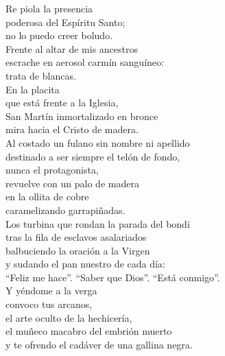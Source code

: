 

Re piola la presencia \\
poderosa del Espíritu Santo; \\
no lo puedo creer boludo. \\
Frente al altar de mis ancestros \\
escrache en aerosol carmín sanguíneo: \\
trata de blancas. \\
En la placita \\
que está frente a la Iglesia,\\
San Martín inmortalizado en bronce \\
mira hacia el Cristo de madera. \\
Al costado un fulano sin nombre ni apellido \\
destinado a ser siempre el telón de fondo, \\
nunca el protagonista, \\
revuelve con un palo de madera \\
en la ollita de cobre \\
caramelizando garrapiñadas. \\
Los turbina que rondan la parada del bondi \\
tras la fila de esclavos asalariados \\
balbuciendo la oración a la Virgen \\
y sudando el pan nuestro de cada día: \\
``Feliz me hace''. ``Saber que Dios''. ``Está conmigo''. \\
Y yéndome a la verga \\
convoco tus arcanos, \\
el arte oculto de la hechicería, \\
el muñeco macabro del embrión muerto \\
y te ofrendo el cadáver de una gallina negra. \\

